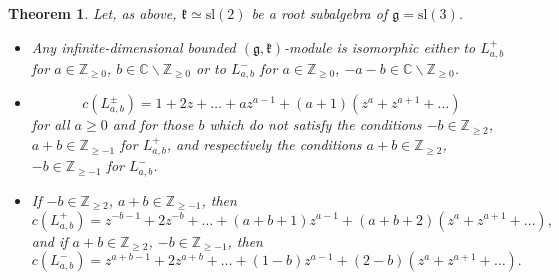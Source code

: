 \documentclass[12pt]{amsart}
\theoremstyle{plain} %
\newtheorem{theorem}[definition]{Theorem}
\renewcommand{\sl}{\mathrm{sl}}
\newcommand {\ZZ} {\mathbb {Z}}
\newcommand {\CC} {\mathbb {C}}
\newcommand{\kk}{\mathfrak{k}}
\renewcommand{\gg}{\mathfrak{g}}
\begin{document}
\begin{theorem}\label{th82}
Let, as above, $\kk\simeq \sl(2)$ be a root subalgebra of $\gg=\sl(3)$.
\begin{itemize}
\item[(a)] Any infinite-dimensional bounded $(\gg,\kk)$-module is isomorphic either to $L_{a,b}^+$ for $a\in\ZZ_{\geq 0}$, $b\in\CC\backslash\ZZ_{\geq 0}$ or to $L^-_{a,b}$ for $a\in\ZZ_{\geq 0}$, $-a-b\in\CC\backslash\ZZ_{\geq 0}$.
\item[(b)]
\begin{equation}\label{eq81}
c(L_{a,b}^\pm)=1+2z+\dots+az^{a-1}+(a+1)(z^a+z^{a+1}+\dots)
\end{equation}
for all $a\geq 0$ and for those $b$ which do not satisfy the conditions $-b\in\ZZ_{\geq 2}$, $a+b\in\ZZ_{\geq -1}$ for $L_{a,b}^+$, and respectively the conditions $a+b\in\ZZ_{\geq 2}$, $-b\in\ZZ_{\geq-1}$ for $L_{a,b}^-$.
\item[(c)] If $-b \in \ZZ_{\geq 2}$, $a+b\in\ZZ_{\geq -1}$, then
\begin{equation}\label{eq82}
c(L_{a,b}^+)=z^{-b-1}+2z^{-b}+\dots+(a+b+1)z^{a-1}+(a+b+2)(z^a+z^{a+1}+\dots),
\end{equation}
and if $a+b\in\ZZ_{\geq 2}$, $-b\in \ZZ_{\geq -1}$, then
\begin{equation}\label{eq83}
c(L_{a,b}^-)=z^{a+b-1}+2z^{a+b}+\dots+(1-b)z^{a-1}+(2-b)(z^a+z^{a+1}+\dots).
\end{equation}
\end{itemize}
\end{theorem}
\end{document}
